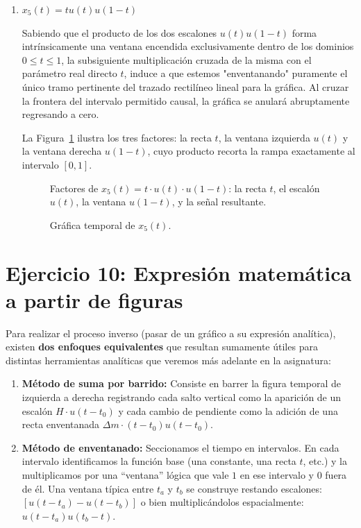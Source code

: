 \documentclass[10pt,a4paper]{article}
\begin{document}
\begin{enumerate}[label=\textbf{\alph*)}]
		\item \textbf{$x_5(t)=tu(t)u(1-t)$}
		
        Sabiendo que el producto de los dos escalones $u(t)u(1-t)$ forma intrínsicamente una ventana encendida exclusivamente dentro de los dominios $0 \le t \le 1$, la subsiguiente multiplicación cruzada de la misma con el parámetro real directo $t$, induce a que estemos "enventanando" puramente el único tramo pertinente del trazado rectilíneo lineal para la gráfica. Al cruzar la frontera del intervalo permitido causal, la gráfica se anulará abruptamente regresando a cero.
		
		La Figura~\ref{fig:ejer1e_sum} ilustra los tres factores: la recta $t$, la ventana izquierda $u(t)$ y la ventana derecha $u(1-t)$, cuyo producto recorta la rampa exactamente al intervalo $[0,1]$.

		\begin{figure}[H]
			\centering
			
			\caption{Factores de $x_5(t) = t\cdot u(t)\cdot u(1-t)$: la recta $t$, el escalón $u(t)$, la ventana $u(1-t)$, y la señal resultante.}
			\label{fig:ejer1e_sum}
		\end{figure}

		\begin{figure}[H]
			\centering
			
			\caption{Gráfica temporal de $x_5(t)$.}
			\label{fig:ejer1e}
		\end{figure}

	\end{enumerate}

	\section*{Ejercicio 10: Expresión matemática a partir de figuras}
	
	Para realizar el proceso inverso (pasar de un gráfico a su expresión analítica), existen \textbf{dos enfoques equivalentes} que resultan sumamente útiles para distintas herramientas analíticas que veremos más adelante en la asignatura:
	
	\begin{enumerate}
	    \item \textbf{Método de suma por barrido:} Consiste en barrer la figura temporal de izquierda a derecha registrando cada salto vertical como la aparición de un escalón $H \cdot u(t-t_0)$ y cada cambio de pendiente como la adición de una recta enventanada $\Delta m \cdot (t-t_0)u(t-t_0)$.
	    \item \textbf{Método de enventanado:} Seccionamos el tiempo en intervalos. En cada intervalo identificamos la función base (una constante, una recta $t$, etc.) y la multiplicamos por una ``ventana'' lógica que vale $1$ en ese intervalo y $0$ fuera de él. Una ventana típica entre $t_a$ y $t_b$ se construye restando escalones: $[u(t-t_a) - u(t-t_b)]$ o bien multiplicándolos espacialmente: $u(t-t_a)u(t_b-t)$.
	\end{enumerate}
\end{document}
